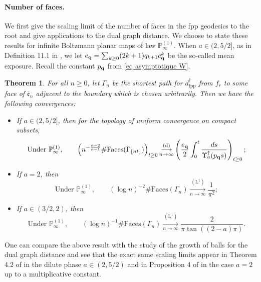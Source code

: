 \documentclass[11pt]{article}
\newtheorem{theorem}{Theorem}[section]
\numberwithin{equation}{section}
\def\P{\mathbb{P}}
\begin{document}
\paragraph{Number of faces.} We first give the scaling limit of the number of faces in the fpp geodesics to the root and give applications to the dual graph distance. We choose to state these results for infinite Boltzmann planar maps of law $\P_\infty^{(1)}$. When $a \in (2,5/2]$, as in Definition 11.1 in \cite{StFlour}, we let ${e}_{\bf q} = \sum_{k\ge 0} (2k+1){q_{k+1} c_{\bf q}^k}$ be the so-called mean exposure. Recall the constant $p_{\bf q}$ from \eqref{eq asymptotique W}.
\begin{theorem}\label{th nombre de faces}
	For all $n \ge 0$, let $\Gamma_n$ be the shortest path for $d^\dagger_{\mathrm{fpp}}$ from $f_r$ to some face of $\overline{\mathfrak{e}}_n$ adjacent to the boundary which is chosen arbitrarily. Then we have the following convergences:
	\begin{itemize}
		\item If $a \in (2,5/2]$, then for the topology of uniform convergence on compact subsets,
		$$
		\text{Under } \P^{(1)}_\infty, \qquad
		\left(
		n^{-\frac{a-2}{a-1}}\# \mathrm{Faces}(\Gamma_{\lfloor nt \rfloor}) 
		\right)_{t\ge 0}
		\mathop{\longrightarrow}\limits_{n \to \infty}^{(\mathrm{d})}
		\left(
		\frac{e_{\bf q}}{2}
		\int_0^t \frac{ds}{\Upsilon_a^\uparrow(p_{\bf q} s)}
		\right)_{t\ge 0};
		$$
		\item If $a =2$, then 
		$$
		\text{Under } \P^{(1)}_\infty, \qquad
		(\log n)^{-2} \# \mathrm{Faces}(\Gamma_{ n }) 
		\mathop{\longrightarrow}\limits_{n \to \infty}^{(\mathrm{L}^1)}
		\frac{1}{\pi^2};
		$$
		\item If $a \in (3/2,2)$, then 
		$$
		\text{Under } \P^{(1)}_\infty, \qquad
		(\log n)^{-1} \# \mathrm{Faces}(\Gamma_{ n }) 
		\mathop{\longrightarrow}\limits_{n \to \infty}^{(\mathrm{L}^1)}
		\frac{2}{\pi \tan((2-a) \pi)}.
		$$
	\end{itemize}
\end{theorem}
{One can compare the above result with the study of the growth of balls for the dual graph distance and see that the exact same scaling limits appear in Theorem 4.2 of \cite{BC} in the dilute phase $a \in (2,5/2)$ and in Proposition 4 of \cite{BCM} in the case $a=2$ up to a multiplicative constant.}
\end{document}
